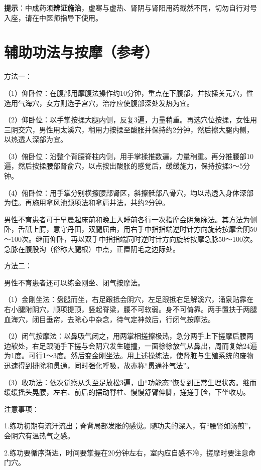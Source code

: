 \documentclass[12pt,UTF8,openany]{ctexbook}
\begin{document}
\textbf{提示}：中成药须\textbf{辨证施治}，虚寒与虚热、肾阴与肾阳用药截然不同，切勿自行对号入座，请在中医师指导下使用。


\section{辅助功法与按摩（参考）}


方法一：

（1）仰卧位：在腹部用摩腹法操作约10分钟，重点在下腹部，并按揉关元穴，性选用气海穴，女方则选子宫穴，治疗应使腹部深处发热为宜。

（2）仰卧位：以手掌按揉大腿内侧，反复3遍，力量稍重。再选穴位按揉，女性用三阴交穴，男性用太溪穴，稍用力按揉至酸胀并保持约2分钟，然后擦大腿内侧，以热透人深部为宜。

（3）俯卧位：沿整个背腰脊柱内侧，用手掌揉推数遍，力量稍重。再分推腰部10遍，然后按揉腰部肾俞穴，以点按出酸胀的感觉后，缓缓施力，保持按揉3～5分钟。

（4）俯卧位：用手掌分别横擦腰部肾区，斜擦骶部八骨穴，均以热透入身体深部为佳。再施用拿风池颈项法和拿肩井法，共约2分钟。

男性不育患者可于早晨起床前和晚上入睡前各行一次指摩会阴急脉法。其方法为侧卧，舌舐上腭，意守丹田，双腿屈曲，用右手中指指端逆时针方向旋转按摩会阴50～100次。继而仰卧，再以双手中指指端同时逆时针方向旋转按摩急脉50～100次。急脉在腹股沟（俗称大腿根）中点，正置阴毛之边际处。

方法二：

男性不育患者还可以练金刚坐、闭气按摩法。

（1）金刚坐法：盘腿而坐，右足跟抵会阴穴，左足跟抵右足解溪穴，涌泉贴靠在右小腿附阴穴，顺项提顶，竖起脊梁，腰不可软弱。身不可倚靠。两手置扶于两腿血海穴，闭目垂帘，去除心中杂念，待气定神敛后，行闭气按摩法。

（2）闭气按摩法：以鼻吸气闭之，用两掌相搓擦极热，急分两手上下搓摩后腰两边软处，右足跟随手下搓与会阴穴发生碰撞，一面徐徐放气从鼻出，周而复始24遍为1度。可行1～3度。然后变金刚坐法。用上述操练法，使肾脏与生殖系统的废物迅速得到排除和贯通，同时强化呼吸，故亦称“贯通补气法”。

（3）收功法：依次觉察从头至足放松3遍，由“功能态”恢复到正常生理状态。继而缓缓摇头晃腰，左右、前后的摆动脊柱、慢慢舒臂伸脚，搓搓手脸，下坐收功。

注意事项：

1.练功初期有流汗流出；脊背局部发胀的感觉。随功夫的深入，有“腰肾如汤煎”，会阴穴有温热气之感。

2.练功要循序渐进，时间要掌握在20分钟左右，室内应自感不冷，搓摩时要注意命门穴。
\end{document}
